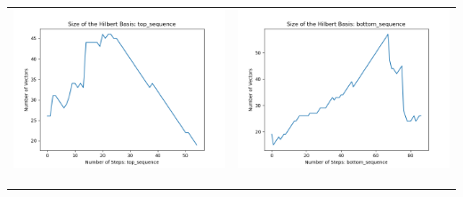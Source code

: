 \documentclass[10pt]{article}
\begin{document}
\begin{tabular}{c|c}
\begin{minipage}{.4\textwidth}
\includegraphics[width=\textwidth]{"DATA/4d/5 generators 2 bound H/top_sequence SIZE"}
\end{minipage} &
\begin{minipage}{.4\textwidth}
\includegraphics[width=\textwidth]{"DATA/4d/5 generators 2 bound H bottomup/bottom_sequence SIZE"}
\end{minipage} \\ \\
\hline \\\begin{minipage}{.4\textwidth}

\end{minipage}
\end{tabular}
\end{document}
